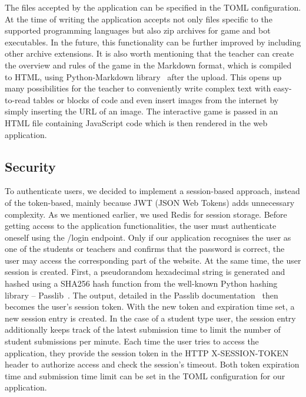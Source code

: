 The files accepted by the application can be specified in the TOML configuration. At the time of writing the application accepts not only files specific to the supported programming languages but also zip archives for game and bot executables. In the future, this functionality can be further improved by including other archive extensions. It is also worth mentioning that the teacher can create the overview and rules of the game in the Markdown format, which is compiled to HTML, using Python-Markdown library~\cite{python_markdown_lib} after the upload. This opens up many possibilities for the teacher to conveniently write complex text with easy-to-read tables or blocks of code and even insert images from the internet by simply inserting the URL of an image. The interactive game is passed in an HTML file containing JavaScript code which is then rendered in the web application.
\subsection{Security}

To authenticate users, we decided to implement a session-based approach, instead of the token-based, mainly because JWT (JSON Web Tokens) adds unnecessary complexity. As we mentioned earlier, we used Redis for session storage. Before getting access to the application functionalities, the user must authenticate oneself using the /login endpoint. Only if our application recognises the user as one of the students or teachers and confirms that the password is correct, the user may access the corresponding part of the website. At the same time, the user session is created. First, a pseudorandom hexadecimal string is generated and hashed using a SHA256 hash function from the well-known Python hashing library -- Passlib~\cite{passlib}. The output, detailed in the Passlib documentation~\cite{passlib_sha256} then becomes the user's session token. With the new token and expiration time set, a new session entry is created. In the case of a student type user, the session entry additionally keeps track of the latest submission time to limit the number of student submissions per minute. Each time the user tries to access the application, they provide the session token in the HTTP X-SESSION-TOKEN header to authorize access and check the session's timeout. Both token expiration time and submission time limit can be set in the TOML configuration for our application.


